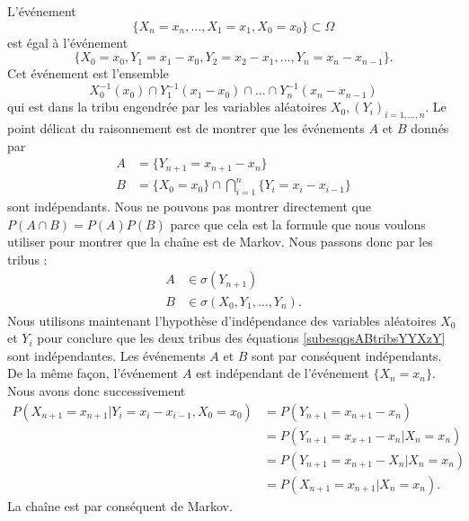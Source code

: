 L'événement 
\begin{equation}
    \{ X_n=x_n,\ldots,X_1=x_1,X_0=x_0 \}\subset\Omega
\end{equation}
est égal à l'événement
\begin{equation}
    \{ X_0=x_0,Y_1=x_1-x_0,Y_2=x_2-x_1,\ldots,Y_n=x_n-x_{n-1} \}.
\end{equation}
Cet événement est l'ensemble
\begin{equation}
    X_0^{-1}(x_0)\cap Y_1^{-1}(x_1-x_0)\cap\ldots\cap Y_{n}^{-1}(x_n-x_{n-1})
\end{equation}
qui est dans la tribu engendrée par les variables aléatoires \( X_0,(Y_i)_{i=1,\ldots,n}\). Le point délicat du raisonnement est de montrer que les événements \( A\) et \( B\) donnés par
\begin{subequations}
    \begin{align}
        A&=\{ Y_{n+1}=x_{n+1}-x_n \}\\
        B&=\{ X_0=x_0 \}\cap\bigcap_{i=1}^n \{ Y_i=x_i-x_{i-1}\}
    \end{align}
\end{subequations}
sont indépendants. Nous ne pouvons pas montrer directement que \( P(A\cap B)=P(A)P(B)\) parce que cela est la formule que nous voulons utiliser pour montrer que la chaîne est de Markov. Nous passons donc par les tribus :
\begin{subequations}        \label{subesqqsABtribsYYXzY}
    \begin{align}
        A&\in\sigma(Y_{n+1})\\
        B&\in\sigma(X_0,Y_1,\ldots,Y_n).
    \end{align}
\end{subequations}
Nous utilisons maintenant l'hypothèse d'indépendance des variables aléatoires \( X_0\) et \( Y_i\) pour conclure que les deux tribus des équations \eqref{subesqqsABtribsYYXzY} sont indépendantes. Les événements \( A\) et \( B\) sont par conséquent indépendants. De la même façon, l'événement \( A\) est indépendant de l'événement \( \{ X_n=x_n \}\). Nous avons donc successivement
\begin{subequations}
    \begin{align}
        P(X_{n+1}=x_{n+1}|Y_i=x_i-x_{i-1},X_0=x_0)&=P(Y_{n+1}=x_{n+1}-x_n)\\
        &=P(Y_{n+1}=x_{x+1}-x_n|X_n=x_n)\\
        &=P(Y_{n+1}=x_{n+1}-X_n|X_n=x_n)\\
        &=P(X_{n+1}=x_{n+1}|X_n=x_n).
    \end{align}
\end{subequations}
La chaîne est par conséquent de Markov.

